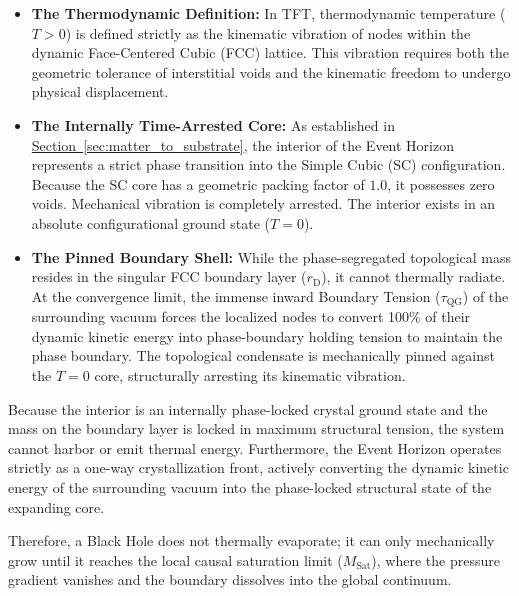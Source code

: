 \begin{itemize}
    \item \textbf{The Thermodynamic Definition:} In TFT, thermodynamic temperature ($T > 0$) is defined strictly as the kinematic vibration of nodes within the dynamic Face-Centered Cubic (FCC) lattice. This vibration requires both the geometric tolerance of interstitial voids and the kinematic freedom to undergo physical displacement.
    
    \item \textbf{The Internally Time-Arrested Core:} As established in \hyperref[sec:matter_to_substrate]{Section~\ref*{sec:matter_to_substrate}}, the interior of the Event Horizon represents a strict phase transition into the Simple Cubic (SC) configuration. Because the SC core has a geometric packing factor of $1.0$, it possesses zero voids. Mechanical vibration is completely arrested. The interior exists in an absolute configurational ground state ($T = 0$).
    
    \item \textbf{The Pinned Boundary Shell:} While the phase-segregated topological mass resides in the singular FCC boundary layer ($r_{\mathrm{D}}$), it cannot thermally radiate. At the convergence limit, the immense inward Boundary Tension ($\tau_{\mathrm{QG}}$) of the surrounding vacuum forces the localized nodes to convert 100\% of their dynamic kinetic energy into phase-boundary holding tension to maintain the phase boundary. The topological condensate is mechanically pinned against the $T=0$ core, structurally arresting its kinematic vibration.
\end{itemize}

Because the interior is an internally phase-locked crystal ground state and the mass on the boundary layer is locked in maximum structural tension, the system cannot harbor or emit thermal energy. Furthermore, the Event Horizon operates strictly as a one-way crystallization front, actively converting the dynamic kinetic energy of the surrounding vacuum into the phase-locked structural state of the expanding core.

Therefore, a Black Hole does not thermally evaporate; it can only mechanically grow until it reaches the local causal saturation limit ($M_{\mathrm{Sat}}$), where the pressure gradient vanishes and the boundary dissolves into the global continuum.


